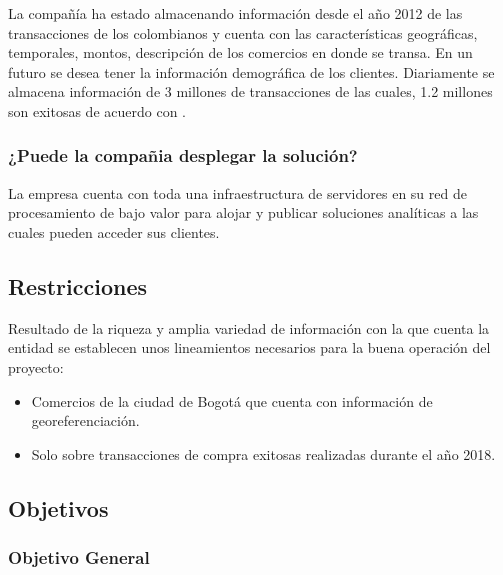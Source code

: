 \documentclass[a4paper]{article}
\begin{document}
La compañía ha estado almacenando información desde el año 2012 de las transacciones de los colombianos y cuenta con las características geográficas, temporales, montos, descripción de los comercios en donde se transa. En un futuro se desea tener la información demográfica de los clientes. Diariamente se almacena información de 3 millones de transacciones de las cuales, 1.2 millones son exitosas de acuerdo con \cite{ARTICLE:1}.

\subsubsection{¿Puede la compañia desplegar la solución?}

La empresa cuenta con toda una infraestructura de servidores en su red de procesamiento de bajo valor para alojar y publicar soluciones analíticas a las cuales pueden acceder sus clientes.


\subsection{Restricciones}

Resultado de la riqueza y amplia variedad de información con la que cuenta la entidad se establecen unos lineamientos necesarios para la buena operación del proyecto:  

\begin{itemize}
	\item Comercios de la ciudad de Bogotá que cuenta con información de georeferenciación.
	\item Solo sobre transacciones de compra exitosas realizadas durante el año 2018.
\end{itemize}



\subsection{Objetivos}

\subsubsection{Objetivo General}
\end{document}
